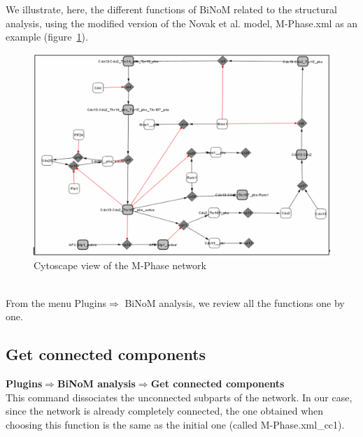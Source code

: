 We illustrate, here, the different functions of BiNoM related to the structural analysis, using the modified version of the Novak et al. model, M-Phase.xml as an example (figure~\ref{Cytoscape_view_of_the_M-Phase_network}).
\begin{figure}
\centering
\includegraphics[width=14 cm]{graphics/Cytoscape_view_of_the_M-Phase_network.png}
\caption{Cytoscape view of the M-Phase network}
\label{Cytoscape_view_of_the_M-Phase_network}
\end{figure}
\\From the menu Plugins$\Rightarrow$ BiNoM analysis, we review all the functions one by one.

\subsection{Get connected components}
\textbf{Plugins$\Rightarrow$BiNoM analysis$\Rightarrow$Get connected components}\\
This command dissociates the unconnected subparts of the network. In our case, since the network is already completely connected, the one obtained when choosing this function is the same as the initial one (called M-Phase.xml\_cc1).
